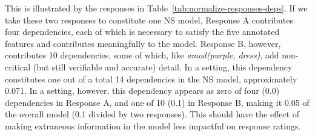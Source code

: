 This is illustrated by the responses in Table~\ref{tab:normalize-responses-deps}. If we take these two responses to constitute one NS model, Response A contributes four dependencies, each of which is necessary to satisfy the five annotated features and contributes meaningfully to the model. Response B, however, contributes 10 dependencies, some of which, like \textit{amod(purple, dress)}, add non-critical (but still verifiable and accurate) detail. In a  setting, this dependency constitutes one out of a total 14 dependencies in the NS model, approximately 0.071. In a  setting, however, this dependency appears as zero of four (0.0) dependencies in Response A, and one of 10 (0.1) in Response B, making it 0.05 of the overall model (0.1 divided by two responses). This should have the effect of making extraneous information in the model less impactful on response ratings.

